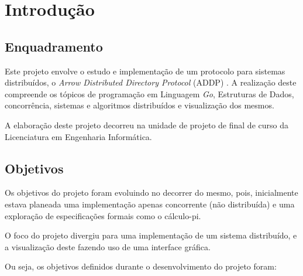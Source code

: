 \chapter{Introdução}
\label{chap:introducao}
\section{Enquadramento}
\label{introducao:sec:enquadramento}


Este projeto envolve o estudo e implementação de um protocolo para sistemas distribuídos, o \textit{Arrow Distributed Directory Protocol} (ADDP) \cite{Arrow}. 
A realização deste compreende os tópicos de programação em Linguagem \emph{Go}, Estruturas de Dados, concorrência, sistemas e algoritmos distribuídos e visualização dos mesmos.

A elaboração deste projeto decorreu na unidade de projeto de final de curso da Licenciatura em Engenharia Informática.



\section{Objetivos}
\label{introducao:sec:objetivos}


Os objetivos do projeto foram evoluindo no decorrer do mesmo, pois, inicialmente estava planeada uma implementação apenas concorrente (não distribuída) 
e uma exploração de especificações formais como o cálculo-pi. 

O foco do projeto divergiu para uma implementação de um sistema distribuído,
e a visualização deste fazendo uso de uma interface gráfica.

Ou seja, os objetivos definidos durante o desenvolvimento do projeto foram:

